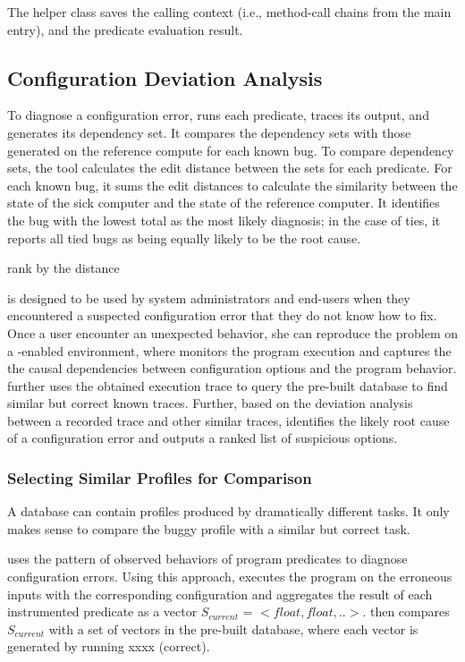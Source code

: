 The helper class  saves the calling context (i.e.,
method-call chains from the main entry), and the predicate evaluation result.


\subsection{Configuration Deviation Analysis}
\label{sec:analysis}

To diagnose a configuration error, \ourtool runs each predicate, traces its
output, and generates its dependency set. It compares the dependency sets
with those generated on the reference compute for each known bug. To compare
dependency sets, the tool calculates the edit distance between the sets
for each predicate. For each known bug, it sums the edit
distances to calculate the similarity between the state of the sick
computer and the state of the reference computer. It identifies the bug
with the lowest total as the most likely diagnosis; in the case of ties,
it reports all tied bugs as being equally likely to be the root cause.

rank by the distance


\ourtool is designed to be used by system administrators and end-users when they
encountered a suspected configuration error that they do not
know how to fix. Once a \ourtool user encounter an unexpected
behavior, she can reproduce the problem on a \ourtool-enabled environment,
where \ourtool monitors the program execution and captures
the the causal dependencies between
configuration options and the program behavior. \ourtool
further uses the obtained execution trace to query the pre-built database
to find similar but correct known traces. Further, based on
the deviation analysis between a recorded trace and other similar traces,
\ourtool identifies the likely root cause of a configuration error and
outputs a ranked list of suspicious options.

\subsubsection{Selecting Similar Profiles for Comparison}

A database can contain profiles produced by dramatically
different tasks. It only makes sense to compare the buggy profile
with a similar but correct task.

\ourtool uses the pattern of observed behaviors of program predicates
to diagnose configuration errors. Using this approach, \ourtool
executes the program on the erroneous inputs with the
corresponding configuration and aggregates the result of
each instrumented predicate as a vector $S_{current}$ = $<float, float, ..>$.
\ourtool then compares $S_{current}$ with a set of
vectors in the pre-built database, where each vector is generated
by running xxxx (correct).


